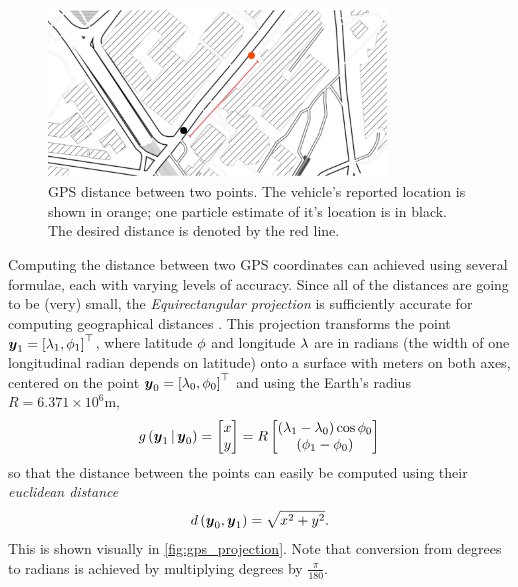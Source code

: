 \begin{knitrout}\small
{}\color{fgcolor}\begin{figure}

{\centering \includegraphics[width=0.8\textwidth]{figure/gps_dist-1} 

}

\caption[GPS distance between two points]{GPS distance between two points. The vehicle's reported location is shown in orange; one particle estimate of it's location is in black. The desired distance is denoted by the red line.}\label{fig:gps_dist}
\end{figure}


\end{knitrout}

Computing the distance between two GPS coordinates can achieved using several formulae, each with varying levels of accuracy. Since all of the distances are going to be (very) small, the \emph{Equirectangular projection} is sufficiently accurate for computing geographical distances \citep{cn}. This projection transforms the point $\boldsymbol{y}_1 = \left[\lambda_1, \phi_1\right]^\top$, where latitude $\phi$ and longitude $\lambda$ are in radians (the width of one longitudinal radian depends on latitude) onto a surface with meters on both axes, centered on the point $\boldsymbol{y}_0 = \left[\lambda_0, \phi_0\right]^\top$ and using the Earth's radius $R = 6.371 \times 10^6$m,
\begin{equation}
\label{eq:equirectangular_projection}
g\left(\boldsymbol{y}_1\,|\,\boldsymbol{y}_0\right) =
\begin{bmatrix} x \\ y \end{bmatrix} =
R \begin{bmatrix}
(\lambda_1 - \lambda_0) \cos \phi_0 \\
(\phi_1 - \phi_0)
\end{bmatrix}
\end{equation}
so that the distance between the points can easily be computed
using their \emph{euclidean distance}
\begin{equation}
\label{eq:obs_dist}
d\left(\boldsymbol{y}_0, \boldsymbol{y}_1\right) = \sqrt{x^2 + y^2}.
\end{equation}
This is shown visually in \cref{fig:gps_projection}.
Note that conversion from degrees to radians is achieved by
multiplying degrees by $\frac{\pi}{180}$.

